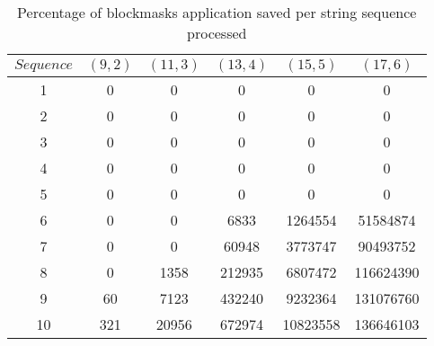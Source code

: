 \begin{table}[h] %
	\renewcommand{\arraystretch}{1.3}
	\caption{Percentage of blockmasks application saved per string sequence processed}
	\label{tbl:blockmask_save}
	\centering
	\begin{tabular}{|c|c|c|c|c|c|}
		\hline 
		\bfseries\boldmath $Sequence$ & 
		\bfseries\boldmath $(9,2)$ & 
		\bfseries\boldmath $(11,3)$ & 
		\bfseries\boldmath $(13,4)$ & 
		\bfseries\boldmath $(15,5)$ & 
		\bfseries\boldmath $(17,6)$ \\
		\hline
			1	& 	0		& 	0		& 	0		&	0			& 	0\\
			2	& 	0		& 	0		& 	0		&	0 			& 	0\\
			3	& 	0		& 	0		& 	0		&	0 			& 	0\\
			4	& 	0		& 	0		& 	0 		&	0 			& 	0\\
			5	& 	0		& 	0 		&	0		&	0			&	0\\
			6	& 	0		& 	0		& 	6833	&	1264554		&	51584874\\
			7	& 	0		& 	0   	& 	60948	&	3773747		&	90493752\\
			8	& 	0	 	&	1358	& 	212935	&	6807472		&	116624390\\
			9	& 	60	 	& 	7123	& 	432240	&	9232364		&	131076760\\
			10	& 	321 	&	20956	& 	672974	&	10823558	&	136646103\\
		\hline\end{tabular}
\end{table}
